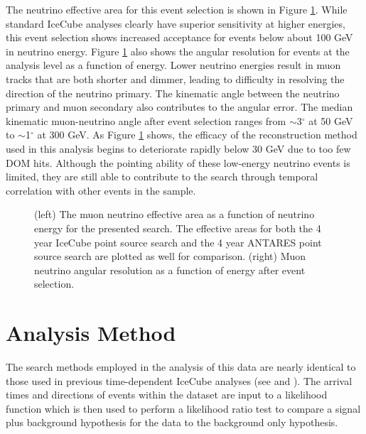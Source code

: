 \documentclass[manuscript]{aastex}
\begin{document}
The neutrino effective area for this event selection is shown in Figure \ref{fig:EffAreaAndAngularResolution}. While standard IceCube analyses clearly have superior sensitivity at higher energies, this event selection shows increased acceptance for events below about 100 GeV in neutrino energy. Figure \ref{fig:EffAreaAndAngularResolution} also shows the angular resolution for events at the analysis level as a function of energy. Lower neutrino energies result in muon tracks that are both shorter and dimmer, leading to difficulty in resolving the direction of the neutrino primary. The kinematic angle between the neutrino primary and muon secondary also contributes to the angular error. The median kinematic muon-neutrino angle after event selection ranges from $\sim$3$^{\circ}$ at 50 GeV to $\sim$1$^{\circ}$ at 300 GeV. As Figure \ref{fig:EffAreaAndAngularResolution} shows, the efficacy of the reconstruction method used in this analysis begins to deteriorate rapidly below 30 GeV due to too few DOM hits. Although the pointing ability of these low-energy neutrino events is limited, they are still able to contribute to the search through temporal correlation with other events in the sample.

\begin{figure}[ht]
\caption[Analysis Effective Area and Angular Resolution]{(left) The muon neutrino effective area as a function of neutrino energy for the presented search. The effective areas for both the 4 year IceCube point source search \citep{2014ApJ...796..109A} and the 4 year ANTARES point source search \citep{2012ApJ...760...53A} are plotted as well for comparison. (right) Muon neutrino angular resolution as a function of energy after event selection.}
\label{fig:EffAreaAndAngularResolution}
\end{figure}


\section{Analysis Method}
The search methods employed in the analysis of this data are nearly identical to those used in previous time-dependent IceCube analyses (see \cite{2008APh....29..299B} and \cite{0004-637X-807-1-46}). The arrival times and directions of events within the dataset are input to a likelihood function which is then used to perform a likelihood ratio test to compare a signal plus background hypothesis for the data to the background only hypothesis.
\end{document}
